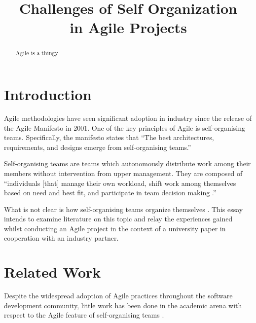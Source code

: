 \documentclass[conference]{IEEEtran}
\begin{document}
\title{Challenges of Self Organization\\in Agile Projects}


\author{
}


\maketitle


\begin{abstract}
Agile is a thingy
\end{abstract}


\section{Introduction}

Agile methodologies have seen significant adoption in industry since the release
of the Agile Manifesto \cite{agileadoption} in 2001. One of the key principles
of Agile is self-organising teams. Specifically, the manifesto states that ``The
best architectures, requirements, and designs emerge from self-organising
teams.'' \cite{fowler2001agile}

Self-organising teams are teams which autonomously distribute work among their
members without intervention from upper management. They are composed of
``individuals [that] manage their own workload, shift work among themselves
based on need and best fit, and participate in team decision
making \cite{highsmith2009agile}.''

What is not clear is how self-organising teams organize themselves
\cite{hoda2010organizing}. This essay intends to examine literature on this
topic and relay the experiences gained whilst conducting an Agile project in the
context of a university paper in cooperation with an industry partner.

\section{Related Work}\label{relwork}

Despite the widespread adoption of Agile practices throughout the software
development community, little work has been done in the academic arena with
respect to the Agile feature of self-organising teams \cite{hoda2010balancing}.
\end{document}
